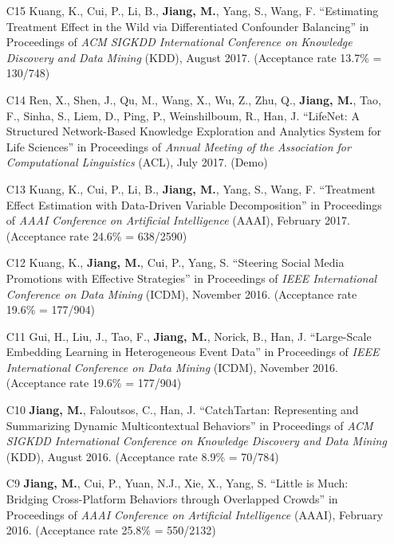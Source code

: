 \documentclass[10pt]{article}
\newenvironment{myindentpar}[1]%
{\begin{list}{}%
         {\setlength{\leftmargin}{#1}}%
         \item[]%
}
{\end{list}}
\newcounter{list}
\begin{document}
\begin{myindentpar}{0.00cm}
\begin{enumerate}[leftmargin=.5cm]
\item[C15] Kuang, K., Cui, P., Li, B., \textbf{Jiang, M.}, Yang, S., Wang, F. ``Estimating Treatment Effect in the Wild via Differentiated Confounder Balancing'' in Proceedings of \textit{ACM SIGKDD International Conference on Knowledge Discovery and Data Mining} (KDD), August 2017. (Acceptance rate 13.7\% = 130/748)

\item[C14] Ren, X., Shen, J., Qu, M., Wang, X., Wu, Z., Zhu, Q., \textbf{Jiang, M.}, Tao, F., Sinha, S., Liem, D., Ping, P., Weinshilboum, R., Han, J. ``LifeNet: A Structured Network-Based Knowledge Exploration and Analytics System for Life Sciences'' in Proceedings of \textit{Annual Meeting of the Association for Computational Linguistics} (ACL), July 2017. (Demo)

\item[C13] Kuang, K., Cui, P., Li, B., \textbf{Jiang, M.}, Yang, S., Wang, F. ``Treatment Effect Estimation with Data-Driven Variable Decomposition'' in Proceedings of \textit{AAAI Conference on Artificial Intelligence} (AAAI), February 2017. (Acceptance rate 24.6\% = 638/2590)

\item[C12] Kuang, K., \textbf{Jiang, M.}, Cui, P., Yang, S. ``Steering Social Media Promotions with Effective Strategies'' in Proceedings of \textit{IEEE International Conference on Data Mining} (ICDM), November 2016. (Acceptance rate 19.6\% = 177/904)

\item[C11] Gui, H., Liu, J., Tao, F., \textbf{Jiang, M.}, Norick, B., Han, J. ``Large-Scale Embedding Learning in Heterogeneous Event Data'' in Proceedings of \textit{IEEE International Conference on Data Mining} (ICDM), November 2016. (Acceptance rate 19.6\% = 177/904)

\item[C10] \textbf{Jiang, M.}, Faloutsos, C., Han, J. ``CatchTartan: Representing and Summarizing Dynamic Multicontextual Behaviors'' in Proceedings of \textit{ACM SIGKDD International Conference on Knowledge Discovery and Data Mining} (KDD), August 2016. (Acceptance rate 8.9\% = 70/784)

\item[C9] \textbf{Jiang, M.}, Cui, P., Yuan, N.J., Xie, X., Yang, S. ``Little is Much: Bridging Cross-Platform Behaviors through Overlapped Crowds'' in Proceedings of \textit{AAAI Conference on Artificial Intelligence} (AAAI), February 2016. (Acceptance rate 25.8\% = 550/2132)


\end{enumerate}
\end{myindentpar}
\end{document}
